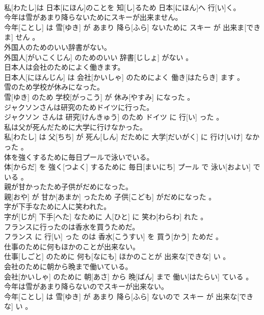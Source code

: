 \documentclass[8pt]{extreport}
\begin{document}
\begin{CJK}{UTF8}{min}
\\	私[わたし]は 日本[にほん]のことを 知[し]るため 日本[にほん]へ 行[い]く。
\\	今年は雪があまり降らないためにスキーが出来ません。	
\\	今年[ことし] は 雪[ゆき] が あまり 降ら[ふら] ないために スキー が 出来ま[できま] せん 。
\\	外国人のためのいい辞書がない。	
\\	外国人[がいこくじん] のためのいい 辞書[じしょ] がない 。
\\	日本人は会社のためによく働きます。	
\\	日本人[にほんじん] は 会社[かいしゃ] のためによく 働き[はたらき] ます 。
\\	雪のため学校が休みになった。	
\\	雪[ゆき] のため 学校[がっこう] が 休み[やすみ] になった 。
\\	ジャクソンさんは研究のためドイツに行った。	
\\	ジャクソン さんは 研究[けんきゅう] のため ドイツ に 行[い] った 。
\\	私は父が死んだために大学に行けなかった。	
\\	私[わたし] は 父[ちち] が 死ん[しん] だために 大学[だいがく] に 行け[いけ] なかった 。
\\	体を強くするために毎日プールで泳いでいる。	
\\	体[からだ] を 強く[つよく] するために 毎日[まいにち] プール で 泳い[およい] でいる 。
\\	親が甘かったため子供がだめになった。	
\\	親[おや] が 甘か[あまか] ったため 子供[こども] がだめになった 。
\\	字が下手なために人に笑われた。	
\\	字が[じが] 下手[へた] なために 人[ひと] に 笑わ[わらわ] れた 。
\\	フランスに行ったのは香水を買うためだ。	
\\	フランス に 行[い] った のは 香水[こうすい] を 買う[かう] ためだ 。
\\	仕事のために何もほかのことが出来ない。	
\\	仕事[しごと] のために 何も[なにも] ほかのことが 出来な[できな] い 。
\\	会社のために朝から晩まで働いている。	
\\	会社[かいしゃ] のために 朝[あさ] から 晩[ばん] まで 働い[はたらい] ている 。
\\	今年は雪があまり降らないのでスキーが出来ない。	
\\	今年[ことし] は 雪[ゆき] が あまり 降ら[ふら] ないので スキー が 出来な[できな] い 。

\end{CJK}
\end{document}
